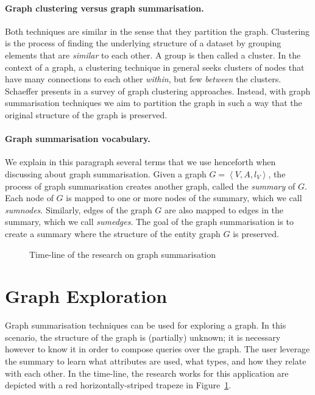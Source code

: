 \paragraph{Graph clustering versus graph summarisation.}

Both techniques are similar in the sense that they partition the graph.
Clustering is the process of finding the underlying structure of a dataset by grouping elements that are \emph{similar} to each other. A group is then called a cluster. In the context of a graph, a clustering technique in general seeks clusters of nodes that have many connections to each other \emph{within}, but few \emph{between} the clusters. Schaeffer presents in \cite{schaeffer:2007:graph} a survey of graph clustering approaches. Instead, with graph summarisation techniques we aim to partition the graph in such a way that the original structure of the graph is preserved.

\paragraph{Graph summarisation vocabulary.}

We explain in this paragraph several terms that we use henceforth when discussing about graph summarisation.
Given a graph $G = \left\langle V, A, l_V \right\rangle$, the process of graph summarisation creates another graph, called the \emph{summary} of $G$. Each node of $G$ is mapped to one or more nodes of the summary, which we call \emph{sumnodes}. Similarly, edges of the graph $G$ are also mapped to edges in the summary, which we call \emph{sumedges}. The goal of the graph summarisation is to create a summary where the structure of the entity graph $G$ is preserved.

\begin{figure}
	\resizebox{\textwidth}{!}{
		
	}
	\caption{Time-line of the research on graph summarisation}
	\label{fig:timeline}
\end{figure}

\section{Graph Exploration}
\label{chap03:review:graph-exploration}

Graph summarisation techniques can be used for exploring a graph. In this scenario, the structure of the graph is (partially) unknown; it is necessary however to know it in order to compose queries over the graph. The user leverage the summary to learn what attributes are used, what types, and how they relate with each other. In the time-line, the research works for this application are depicted with a red horizontally-striped trapeze in Figure~\ref{fig:timeline}.\\

